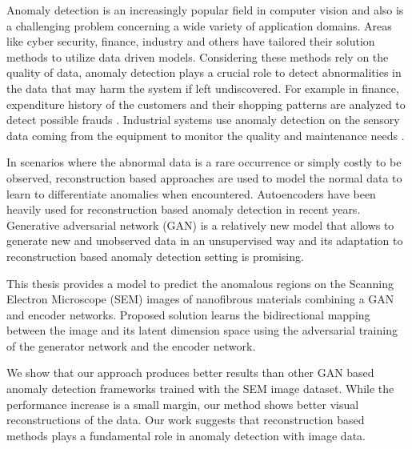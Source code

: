 
\begingroup

Anomaly detection is an increasingly popular field in computer vision and also is a challenging 
problem concerning a wide variety of application domains.
Areas like cyber security, finance, industry and others have tailored their solution methods to 
utilize data driven models. Considering these methods rely on the quality of data, 
anomaly detection plays a crucial role to detect abnormalities in the data that may harm the system if 
left undiscovered. For example in finance, expenditure history of the customers and their shopping 
patterns are analyzed to detect possible frauds \cite{finance_anomaly}. Industrial systems 
use anomaly detection on the sensory data coming from the equipment to monitor the quality and 
maintenance needs \cite{inproceedings_industry}.

In scenarios where the abnormal data is a rare occurrence or simply costly 
to be observed, reconstruction based approaches are used to model the normal data to learn to 
differentiate anomalies when encountered. Autoencoders have been heavily used for reconstruction based 
anomaly detection in recent years. Generative adversarial network (GAN) is a relatively new model 
that allows to generate new and unobserved data in an unsupervised way and 
its adaptation to reconstruction based anomaly detection setting is promising.

This thesis provides a model to predict the anomalous regions on the Scanning Electron Microscope 
(SEM) images of nanofibrous materials combining a GAN and encoder networks. 
Proposed solution learns the bidirectional mapping between the image 
and its latent dimension space using the adversarial training of the generator network and the 
encoder network. 

We show that our approach produces better results than other GAN based anomaly detection frameworks 
trained with the SEM image dataset. While the performance increase is a small margin, our method shows better 
visual reconstructions of the data. Our work suggests that reconstruction based methods plays a fundamental
role in anomaly detection with image data.
\endgroup